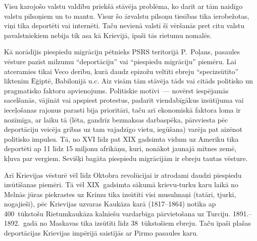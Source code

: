 \documentclass[twoside,a5paper,12pt,fleqn,openany]{extbook}
\begin{document}
Visu karojošo valstu valdību priekšā stāvēja problēma, ko darīt ar tām naidīgo valstu pilsoņiem un to mantu. Visur šo ārvalstu pilsoņu tiesības tika ierobežotas, viņi tika deportēti vai internēti. Taču nevienā valstī šī vēršanās pret citu valstu pavalstniekiem nebija tik asa kā Krievijā, īpaši tās rietumu nomalēs.

Kā norādījis piespiedu migrāciju pētnieks PSRS teritorijā P.~Poļans, pasaules vēsture pazīst milzumu ``deportāciju'' vai ``piespiedu migrāciju'' piemēru. Lai atceramies tikai Veco derību, kurā daudz epizožu veltīti ebreju ``specizsūtīto'' liktenim Ēģiptē, Babilonijā u.c. Aiz visām tām stāvēja tāds vai citāds politisko un pragmatisko faktoru apvienojums. Politiskie motīvi~--- novērst iespējamās sacelšanās, vājināt vai apspiest protestus, padarīt viendabīgākus izsūtījuma vai ieceļošanas rajonus parasti bija prioritāri, taču arī ekonomiskā faktora loma ir nozīmīga, ar laiku tā (lēta, gandrīz bezmaksas darbaspēka, pārsviesta pēc deportāciju veicēja gribas uz tam vajadzīgo vietu, iegūšana) varēja pat aizēnot politisko impulsu. Tā, no XVI līdz pat XIX gadsimta vidum uz Ameriku tika deportēti ap 11 līdz 15 miljonu afrikāņu, kuri, nonākot jaunajā mītnes zemē, kļuva par vergiem. Sevišķi bagāta piespiedu migrācijām ir ebreju tautas vēsture.

Arī Krievijas vēsturē vēl līdz Oktobra revolūcijai ir atrodami daudzi piespiedu izsūtīšanas piemēri. Tā vēl XIX~gadsimta sākumā krievu-turku karu laikā no Melnās jūras piekrastes uz Krimu tika izsūtīti visi musulmaņi (tatāri, tjurki, nogajieši), pēc Krievijas uzvaras Kaukāza karā (1817--1864) notika ap 400~tūkstošu Rietumkaukāza kalniešu vardarbīga pārvietošana uz Turciju. 1891.--1892.~gadā no Maskavas tika izsūtīti līdz 38~tūkstošiem ebreju. Taču īpaši plašas deportācijas Krievijas impērijā saistījās ar Pirmo pasaules karu.
\end{document}
